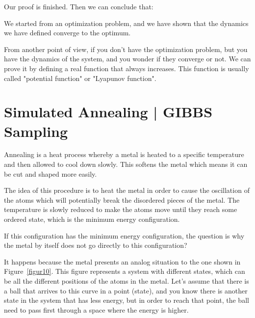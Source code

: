 Our proof is finished. Then we can conclude that:
\begin{remark}
We started from an optimization problem, and we have shown that the dynamics we have defined converge to the optimum.
\end{remark}
\begin{remark}
From another point of view, if you don't have the optimization problem, but you have the dynamics of the system, and you wonder if they converge or not. We can prove it by defining a real function that always increases. This function is usually called "potential function" or "Lyapunov function".
\end{remark}


\section{Simulated Annealing | GIBBS Sampling}

Annealing is a heat process whereby a metal is heated to a specific temperature and then allowed to cool down slowly. This softens the metal which means it can be cut and shaped more easily.

The idea of this procedure is to heat the metal in order to cause the oscillation of the atoms which will potentially break the disordered pieces of the metal. The temperature is slowly reduced to make the atoms move until they reach some ordered state, which is the minimum energy configuration.  

If this configuration has the minimum energy configuration, the question is why the metal by itself does not go directly to this configuration? 

It happens because the metal presents an analog situation to the one shown in Figure~\ref{figur10}. This figure represents a system with different states, which can be all the different positions of the atoms in the metal. Let's assume that there is a ball that arrives to this curve in a point (state), and you know there is another state in the system that has less energy, but in order to reach that point, the ball need to pass first through a space where the energy is higher.

